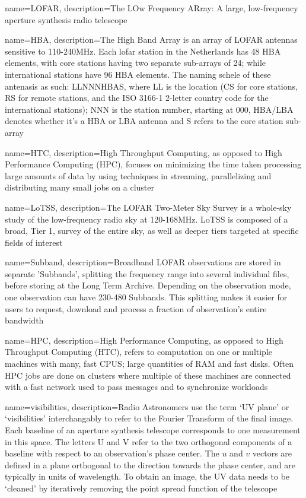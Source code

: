 
\makeglossaries

{
    name=LOFAR,
    description={The LOw Frequency ARray: A large, low-frequency aperture synthesis radio telescope} 
}

{
    name=HBA,
    description={The High Band Array is an array of LOFAR antennas sensitive to 110-240MHz. Each lofar station in the Netherlands has 48 HBA elements, with core stations having two separate sub-arrays of 24; while international stations have 96 HBA elements. The naming schele of these antenasis as such: LLNNNHBAS, where LL is the location (CS for core stations, RS for remote stations, and the ISO 3166-1 2-letter country code for the international stations); NNN is the station number, starting at 000, HBA/LBA denotes whether it's a HBA or LBA antenna and S refers to the core station sub-array}
}

{
    name=HTC,
    description={High Throughput Computing, as opposed to High Performance Computing (\Gls{HPC}), focuses on minimizing the time taken processing large amounts of data by using techniques in streaming, parallelizing and distributing many small jobs on a cluster }
}


{
    name=LoTSS,
    description={The LOFAR Two-Meter Sky Survey is a whole-sky study of the low-frequency radio sky at 120-168MHz. LoTSS is composed of a broad, Tier 1, survey of the entire sky, as well as deeper tiers targeted at specific fields of interest }
}


{
    name=Subband,
    description={Broadband LOFAR observations are stored in separate 'Subbands', splitting the frequency range into several individual files, before storing at the Long Term Archive. Depending on the observation mode, one observation can have 230-480 Subbands. This splitting makes it easier for users to request, download and process a fraction of observation's entire bandwidth}
}

{
    name=HPC,
    description={High Performance Computing, as opposed to High Throughput Computing (\Gls{HTC}), refers to computation on one or multiple machines with many, fast CPUS; large quantities of RAM and fast disks. Often HPC jobs are done on clusters where multiple of these machines are connected with a fast network used to pass messages and to synchronize workloads 
}}

{
    name={visibilities},
    description={Radio Astronomers use the term `UV plane' or `visibilities' interchangably to refer to the Fourier Transform of the final image. Each baseline of an aperture synthesis telescope corresponds to one measurement in this space. The letters U and V refer to the two  orthogonal components of a baseline with respect to an observation's phase center. The $u$ and $v$ vectors are defined in a plane orthogonal to the direction towards the phase center, and are typically in units of wavelength. To obtain an image, the UV data needs to be `cleaned' by iteratively removing the point spread function of the telescope}
}

